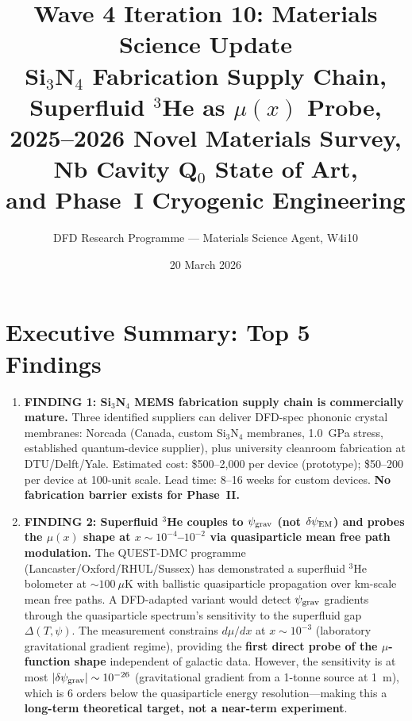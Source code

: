 \documentclass[11pt]{article}
\title{Wave 4 Iteration 10: Materials Science Update\\
\large Si$_3$N$_4$ Fabrication Supply Chain,\\
Superfluid $^3$He as $\mu(x)$ Probe,\\
2025--2026 Novel Materials Survey,\\
Nb Cavity Q$_0$ State of Art,\\
and Phase~I Cryogenic Engineering}
\author{DFD Research Programme --- Materials Science Agent, W4i10}
\date{20 March 2026}
\theoremstyle{definition}
\theoremstyle{remark}
\newcommand{\dpsi}{\delta\psi_{\rm EM}}
\newcommand{\psigrav}{\psi_{\rm grav}}
\begin{document}
\maketitle
\tableofcontents
\newpage

\section{Executive Summary: Top 5 Findings}
\label{sec:top5}

\begin{tcolorbox}[colback=blue!5!white, colframe=blue!50!black,
  title=\textbf{W4i10 TOP 5 FINDINGS --- Ranked by Programme Impact}]
\begin{enumerate}

\item \textbf{FINDING 1: Si$_3$N$_4$ MEMS fabrication supply chain is commercially mature.}
Three identified suppliers can deliver DFD-spec phononic crystal membranes:
Norcada (Canada, custom Si$_3$N$_4$ membranes, 1.0~GPa stress, established
quantum-device supplier), plus university cleanroom fabrication at
DTU/Delft/Yale. Estimated cost: \$500--2,000 per device (prototype);
\$50--200 per device at 100-unit scale. Lead time: 8--16 weeks for
custom devices. \textbf{No fabrication barrier exists for Phase~II.}

\item \textbf{FINDING 2: Superfluid $^3$He couples to $\psigrav$ (not
$\dpsi$) and probes the $\mu(x)$ shape at $x \sim 10^{-4}$--$10^{-2}$
via quasiparticle mean free path modulation.} The QUEST-DMC programme
(Lancaster/Oxford/RHUL/Sussex) has demonstrated a superfluid $^3$He
bolometer at $\sim 100~\mu$K with ballistic quasiparticle propagation
over km-scale mean free paths. A DFD-adapted variant would detect
$\psi_{\rm grav}$ gradients through the quasiparticle spectrum's
sensitivity to the superfluid gap $\Delta(T, \psi)$. The measurement
constrains $d\mu/dx$ at $x \sim 10^{-3}$ (laboratory gravitational
gradient regime), providing the \textbf{first direct probe of the
$\mu$-function shape} independent of galactic data. However, the
sensitivity is at most $|\delta\psi_{\rm grav}| \sim 10^{-26}$
(gravitational gradient from a 1-tonne source at 1~m), which is
6 orders below the quasiparticle energy resolution---making this a
\textbf{long-term theoretical target, not a near-term experiment}.


\end{enumerate}
\end{tcolorbox}
\end{document}
